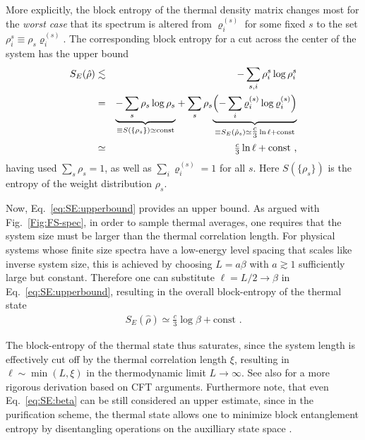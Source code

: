 \documentclass[aps,prx,twocolumn,showpacs,psfig,superscriptaddress,longbibliography]{revtex4-1}
\newcommand{\Eq}[1]{Eq.~\eqref{#1}}
\newcommand{\Fig}[1]{Fig.~\ref{#1}}
\begin{document}
More explicitly, the block entropy of the thermal density matrix
changes most for the {\it worst case} that its spectrum is altered
from $\varrho^{(s)}_i$ for some fixed $s$ to the set $\rho^s_{i}
\equiv \rho_s \varrho^{(s)}_i$.  The corresponding block entropy for
a cut across the center of the system has the upper bound
%
\begin{eqnarray}
   S_E(\hat{\rho}) & \lesssim & -\sum_{s,i}
      \rho^s_{i} \log \rho^s_{i} \notag \\
   &=&  \underset{\equiv S(\{\rho_s\})
     \simeq \mathrm{const}}{
     \underbrace{- \sum_{s}\rho_s \log \rho_s}}
   + \sum_{s} \rho_s \underset{ \equiv S_E(\hat{\rho}_s) 
      \simeq \tfrac{c}{3} \ln \ell + \mathrm{const} }{
      \underbrace{
      \Bigl( - \sum_{i}
      \varrho^{(s)}_i \log \varrho^{(s)}_i \Bigr)}} \notag  \\
   &\simeq&  \tfrac{c}{3} \ln \ell + \mathrm{const}
\text{ ,}\label{eq:SE:upperbound}
\end{eqnarray}
having used $\sum_s \rho_s=1$, as well as $\sum_i \varrho^{(s)}_i=1$
for all $s$.  Here $S(\{\rho_s\})$ is the entropy of the weight
distribution $\rho_s$.  

Now, \Eq{eq:SE:upperbound} provides an upper bound.  As argued with
\Fig{Fig:FS-spec}, in order to sample thermal averages, one requires
that the system size must be larger than the thermal correlation
length.  For physical systems whose finite size spectra have a
low-energy level spacing that scales like inverse system size, this
is achieved by choosing $L=a \beta$ with $a\gtrsim1$ sufficiently
large but constant.  Therefore one can substitute $\ell=L/2 \to
\beta$ in \Eq{eq:SE:upperbound}, resulting in the overall
block-entropy of the thermal state
%
\begin{eqnarray}
   S_E(\hat{\rho}) \simeq
   \tfrac{c}{3} \log \beta + \mathrm{const}
\text{ .}\label{eq:SE:beta}
\end{eqnarray}

%
The block-entropy of the thermal state thus saturates, since
the system length is effectively cut off by the thermal correlation
length $\xi$, resulting in $\ell \sim \min(L,\xi)$ in the
thermodynamic limit $L\to\infty$. 
%
See also \cite{Barthel.t:2017:FiniteT,Dubail17} for a more
rigorous derivation based on CFT arguments.  Furthermore note, that
even \Eq{eq:SE:beta} can be still considered an upper estimate,
since in the purification scheme, the thermal state allows one to
minimize block entanglement entropy by disentangling operations on
the auxilliary state space \cite{Terhal.b.m+:2002:Entanglement,
Hauschild17}. 
\end{document}
